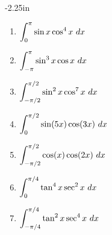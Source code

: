 \begin{adjustwidth*}{}{-2.25in}
\begin{multicols*}{2}

\begin{enumerate}[1),resume]
\item $\ds \int_0^{\pi} \sin x\cos^4x\ dx$
\item $\ds \int_{-\pi}^{\pi} \sin^3 x\cos x\ dx$
\item $\displaystyle \int_{-\pi/2}^{\pi/2} \sin^2 x\cos^7 x\ dx$
\item $\displaystyle \int_{0}^{\pi/2} \sin(5 x)\cos(3x)\ dx$
\item $\displaystyle \int_{-\pi/2}^{\pi/2} \cos(x)\cos(2x)\ dx$
\item $\ds \int_{0}^{\pi/4} \tan^4x\sec^2x\ dx$
\item $\displaystyle \int_{-\pi/4}^{\pi/4} \tan^2x\sec^4x\ dx$
\end{enumerate}

\end{multicols*}
\end{adjustwidth*}

%
%
%

\afterexercises